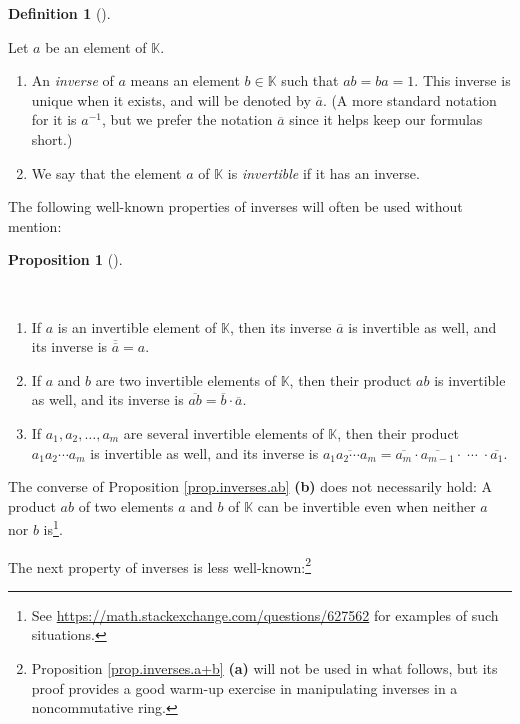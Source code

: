 \documentclass[numbers=enddot,12pt,final,onecolumn,notitlepage]{scrartcl}%
\theoremstyle{definition}
\newtheorem{prop}[theo]{Proposition}
\newenvironment{proposition}[1][]
{\begin{prop}[#1]\begin{leftbar}}
{\end{leftbar}\end{prop}}
\newtheorem{defi}[theo]{Definition}
\newenvironment{definition}[1][]
{\begin{defi}[#1]\begin{leftbar}}
{\end{leftbar}\end{defi}}
\begin{document}
\begin{definition}
\label{def.inverses.inv}Let $a$ be an element of $\mathbb{K}$.

\begin{enumerate}
\item[\textbf{(a)}] An \emph{inverse} of $a$ means an element $b\in\mathbb{K}$
such that $ab=ba=1$. This inverse is unique when it exists, and will be
denoted by $\overline{a}$. (A more standard notation for it is $a^{-1}$, but
we prefer the notation $\overline{a}$ since it helps keep our formulas short.)

\item[\textbf{(b)}] We say that the element $a$ of $\mathbb{K}$ is
\emph{invertible} if it has an inverse.
\end{enumerate}
\end{definition}

The following well-known properties of inverses will often be used without mention:

\begin{proposition}
\label{prop.inverses.ab}\ \ 

\begin{enumerate}
\item[\textbf{(a)}] If $a$ is an invertible element of $\mathbb{K}$, then its
inverse $\overline{a}$ is invertible as well, and its inverse is
$\overline{\overline{a}}=a$.

\item[\textbf{(b)}] If $a$ and $b$ are two invertible elements of $\mathbb{K}%
$, then their product $ab$ is invertible as well, and its inverse is
$\overline{ab}=\overline{b}\cdot\overline{a}$.

\item[\textbf{(c)}] If $a_{1},a_{2},\ldots,a_{m}$ are several invertible
elements of $\mathbb{K}$, then their product $a_{1}a_{2}\cdots a_{m}$ is
invertible as well, and its inverse is $\overline{a_{1}a_{2}\cdots a_{m}%
}=\overline{a_{m}}\cdot\overline{a_{m-1}}\cdot\; \cdots\; \cdot\overline
{a_{1}}$.
\end{enumerate}
\end{proposition}

The converse of Proposition \ref{prop.inverses.ab} \textbf{(b)} does not
necessarily hold: A product $ab$ of two elements $a$ and $b$ of $\mathbb{K}$
can be invertible even when neither $a$ nor $b$ is\footnote{See
\url{https://math.stackexchange.com/questions/627562} for examples of such
situations.}.

The next property of inverses is less well-known:\footnote{Proposition
\ref{prop.inverses.a+b} \textbf{(a)} will not be used in what follows, but its
proof provides a good warm-up exercise in manipulating inverses in a
noncommutative ring.}
\end{document}
